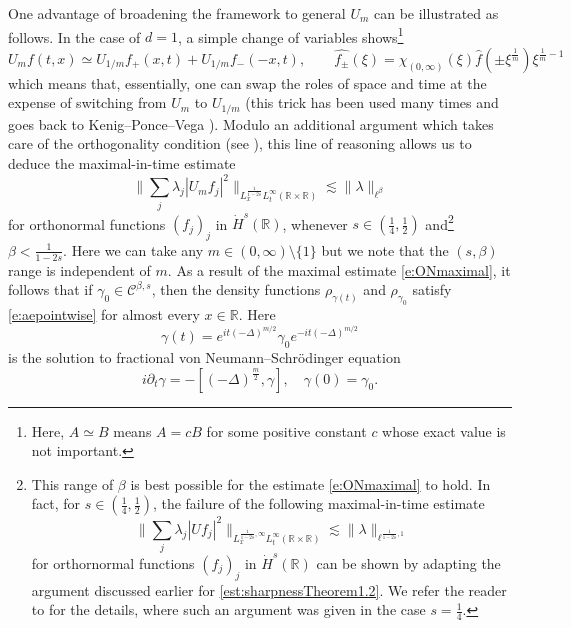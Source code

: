\documentclass[a4paper]{amsart}
\numberwithin{equation}{section}%
\theoremstyle{plain}%
\theoremstyle{definition}
\theoremstyle{remark}%
\newcommand{\R}{{\mathbb R}}
\begin{document}
One advantage of broadening the framework to general $U_m$ can be illustrated as follows. In the case of $d = 1$, a simple change of variables shows\footnote{Here, $A \simeq B$ means $A = cB$ for some positive constant $c$ whose exact value is not important.}
\[
U_mf(t,x) \simeq U_{1/m} f_+(x,t) + U_{1/m} f_-(-x,t), \qquad \widehat{f_\pm}(\xi) = \chi_{(0,\infty)}(\xi)\widehat{f}(\pm \xi^\frac{1}{m})\xi^{\frac{1}{m} - 1}
\]
which means that, essentially, one can swap the roles of space and time at the expense of switching from $U_m$ to $U_{1/m}$ (this trick has been used many times and goes back to Kenig--Ponce--Vega \cite{KPV}). Modulo an additional argument which takes care of the orthogonality condition (see \cite[Lemma 4.2]{BLN_Selecta}), this line of reasoning allows us to deduce the maximal-in-time estimate
\begin{equation} \label{e:ONmaximal}
\bigg\| \sum_j \lambda_j |U_mf_j|^2 \bigg\|_{L^{\frac{1}{1-2s}}_xL^\infty_t(\mathbb{R} \times \mathbb{R})} \lesssim \| \lambda \|_{\ell^\beta}
\end{equation}
for orthonormal functions $(f_j)_j$ in $\dot{H}^{s}(\mathbb{R})$, whenever $s \in (\frac{1}{4},\frac{1}{2})$ and\footnote{This range of $\beta$ is best possible for the estimate \eqref{e:ONmaximal} to hold. In fact, for $s \in (\frac{1}{4},\frac{1}{2})$, the failure of the following maximal-in-time estimate
\[
\bigg\| \sum_j \lambda_j |Uf_j|^2 \bigg\|_{L^{\frac{1}{1-2s},\infty}_xL^\infty_t(\mathbb{R} \times \mathbb{R})} \lesssim \| \lambda \|_{\ell^{\frac{1}{1-2s},1}}
\]
for orthornormal functions $(f_j)_j$ in $\dot{H}^s(\R)$ can be shown by adapting the argument discussed earlier for \eqref{est:sharpnessTheorem1.2}. We refer the reader to \cite{BLN_Selecta} for the details, where such an argument was given in the case $s = \frac{1}{4}$.} $\beta < \frac{1}{1-2s}$. Here we can take any $m \in (0,\infty) \setminus \{1\}$ but we note that the $(s,\beta)$ range is independent of $m$. As a result of the maximal estimate \eqref{e:ONmaximal}, it follows that if $\gamma_0 \in  \mathcal{C}^{\beta,s}$, then the density functions $\rho_{\gamma(t)}$ and $\rho_{\gamma_0}$ satisfy \eqref{e:aepointwise} for almost every $x \in \mathbb{R}$. Here
\[
\gamma(t) = e^{it(-\Delta)^{m/2}}\gamma_0e^{-it(-\Delta)^{m/2}}
\]
is the solution to fractional von Neumann--Schr\"odinger equation
\begin{equation} \label{e:fractionalvN-S} 
i\partial_t \gamma = -[(-\Delta)^{\frac{m}{2}},\gamma], \quad \gamma(0) = \gamma_0.
\end{equation}
\end{document}
